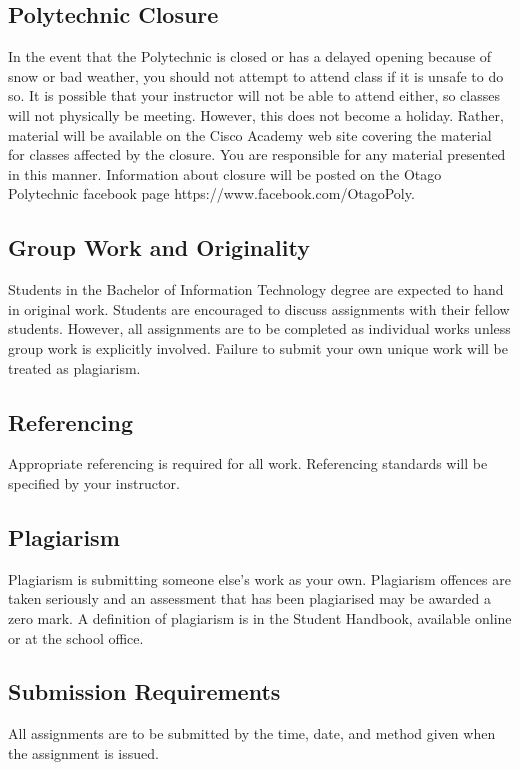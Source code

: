 \documentclass{article}
\begin{document}
\subsection*{Polytechnic Closure}
In the event that the Polytechnic is closed or has a delayed opening because of snow or bad weather, you should not attempt to attend class if it is unsafe to do so. It is possible that your instructor will not be able to attend either, so classes will not physically be meeting. However, this does not become a holiday. Rather, material will be available on the Cisco Academy web site covering the material for classes affected by the closure. You are responsible for any material presented in this manner. Information about closure will be posted on the Otago Polytechnic facebook page https://www.facebook.com/OtagoPoly.

\subsection*{Group Work and Originality}
Students in the Bachelor of Information Technology degree are expected to hand in original work.  Students are encouraged to discuss
assignments with their fellow students.  However, all assignments are to be completed as individual works unless group work is explicitly involved.
Failure to submit your own unique work will be treated as plagiarism.

\subsection*{Referencing}
Appropriate referencing is required for all work.  Referencing standards will be specified by your instructor.

\subsection*{Plagiarism}
Plagiarism is submitting someone else's work as your own.  Plagiarism offences are taken seriously and an
assessment that has been plagiarised may be awarded a zero mark.  A definition of plagiarism is in the Student Handbook,
available online or at the school office.

\subsection*{Submission Requirements}
All assignments are to be submitted by the time, date, and method given when the assignment is issued.
\end{document}
